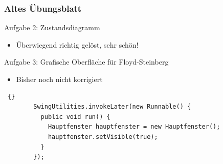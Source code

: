 
\begin{frame}[fragile]
\frametitle{Altes Übungsblatt}
	\begin{block}{Aufgabe 2: Zustandsdiagramm}
	\begin{itemize}
	\item Überwiegend richtig gelöst, sehr schön!
	\end{itemize}
	\end{block}
	\pause
	\begin{block}{Aufgabe 3:  Grafische Oberfläche für Floyd-Steinberg} 
	\begin{itemize}
	\item Bisher noch nicht korrigiert
	\end{itemize}
	\begin{lstlisting} {}
		SwingUtilities.invokeLater(new Runnable() {
		  public void run() {
		    Hauptfenster hauptfenster = new Hauptfenster();
		    hauptfenster.setVisible(true);
		  }
		});
	\end{lstlisting}
	\end{block}
\end{frame}

